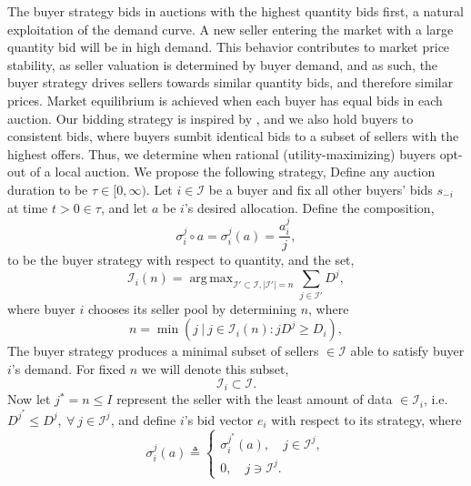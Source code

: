 \documentclass[12pt]{article}
\theoremstyle{definition}
\newcommand{\mcI}{\mathcal{I}}
\newcommand{\g}{\sigma}
\DeclareMathOperator*{\argmax}{arg\,max}
\DeclareMathOperator*{\argmin}{arg\,min}
\begin{document}
\begin{multicols}{2}
The buyer strategy bids in auctions with the highest quantity bids first,
a natural exploitation of the demand curve. A new seller entering the market
with a large quantity bid will be in high demand. This behavior contributes to market price
stability, as seller valuation is determined by buyer demand, and as such, the
buyer strategy drives sellers towards similar quantity bids, and therefore
similar prices. Market equilibrium is achieved when each buyer has equal bids in
each auction. Our bidding strategy is inspired by \cite{lazar}, and we also
hold buyers to consistent bids, where buyers sumbit identical bids to a
subset of sellers with the highest offers.
Thus, we determine when rational (utility-maximizing) buyers opt-out of a local auction. 
We propose the following strategy, 
{
\label{buyerstrategy}
Define any auction duration to be $\tau \in [0,\infty)$. 
Let $i\in\mcI$ be a buyer and fix all other buyers' bids $s_{-i}$ at time
$t>0\in\tau$, and let $a$ be $i$'s desired allocation. 
Define the composition,
$$
     \g_i^j \circ a = \g_i^j(a) = \frac{a_i^j}{j},
$$
to be the buyer strategy with respect to quantity, and the set,
$$
    \mcI_i(n) =\argmax_{\mcI' \subset \mcI, \vert\mcI'\vert =
n}\sum_{j\in\mcI'} D^j,
$$
where buyer $i$ chooses its seller pool by determining $n$, where
\begin{equation}\label{buyercoordinate}
    n = \min( j\ \vert\ j\in \mcI_i(n): j D^j\ge D_i),
\end{equation} 
The buyer strategy produces a minimal subset of sellers $\in \mcI$ 
able to satisfy buyer $i$'s demand. For 
fixed $n$ we will denote this subset,
\begin{equation}\label{sellers}
    \mcI_i \subset \mcI.
\end{equation}  
Now let $j^* = n \le I$ represent the seller with the least amount of data
$\in\mcI_i$, i.e. $D^{j^*} \le D^j, \ \forall\ j \in\mcI^j$, and define $i$'s bid
vector $e_i$ with respect to its strategy, where
\begin{equation}\label{opt-eq}
    \g_i^j(a) \triangleq \begin{cases} \g_i^{j^*}(a), \quad j\in\mcI^j,\\
            0, \quad j\ni\mcI^j.\end{cases}

\end{equation}}
\end{multicols}
\end{document}
